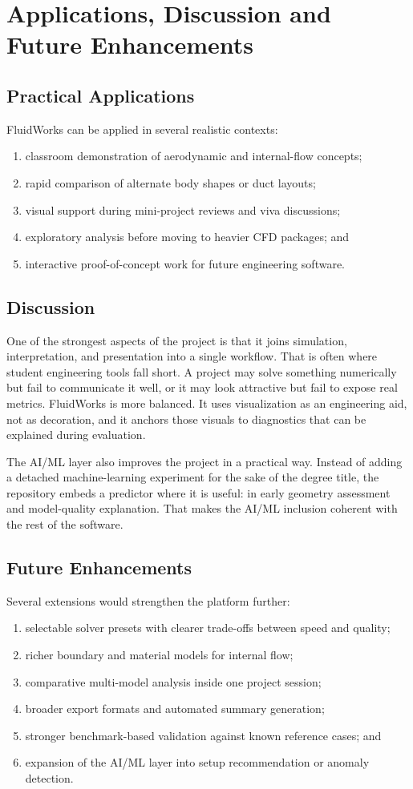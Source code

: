 \documentclass[12pt,a4paper,titlepage]{report}
\begin{document}
\chapter{Applications, Discussion and Future Enhancements}
\section{Practical Applications}
FluidWorks can be applied in several realistic contexts:
\begin{enumerate}
\item classroom demonstration of aerodynamic and internal-flow concepts;
\item rapid comparison of alternate body shapes or duct layouts;
\item visual support during mini-project reviews and viva discussions;
\item exploratory analysis before moving to heavier CFD packages; and
\item interactive proof-of-concept work for future engineering software.
\end{enumerate}

\section{Discussion}
One of the strongest aspects of the project is that it joins simulation, interpretation, and presentation into a single workflow. That is often where student engineering tools fall short. A project may solve something numerically but fail to communicate it well, or it may look attractive but fail to expose real metrics. FluidWorks is more balanced. It uses visualization as an engineering aid, not as decoration, and it anchors those visuals to diagnostics that can be explained during evaluation.

The AI/ML layer also improves the project in a practical way. Instead of adding a detached machine-learning experiment for the sake of the degree title, the repository embeds a predictor where it is useful: in early geometry assessment and model-quality explanation. That makes the AI/ML inclusion coherent with the rest of the software.

\section{Future Enhancements}
Several extensions would strengthen the platform further:
\begin{enumerate}
\item selectable solver presets with clearer trade-offs between speed and quality;
\item richer boundary and material models for internal flow;
\item comparative multi-model analysis inside one project session;
\item broader export formats and automated summary generation;
\item stronger benchmark-based validation against known reference cases; and
\item expansion of the AI/ML layer into setup recommendation or anomaly detection.
\end{enumerate}
\end{document}
